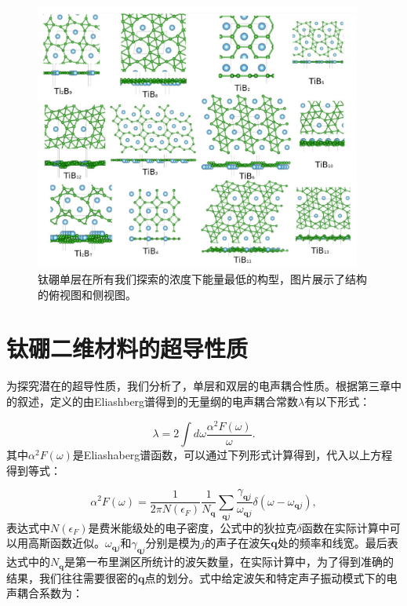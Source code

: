 \begin{figure}
  \includegraphics[width=0.96\textwidth]{figs/ch5_all_configs.png}
  \centering
  \caption{钛硼单层在所有我们探索的浓度下能量最低的构型，图片展示了结构的俯视图和侧视图。}
  \label{fig:ch5_all_configs}
\end{figure}

\section{钛硼二维材料的超导性质}
为探究潜在的超导性质，我们分析了，单层和双层的电声耦合性质。根据第三章中的叙述，定义的由Eliashberg谱得到的无量纲的电声耦合常数$\lambda$有以下形式：

\begin{equation}\label{eq:lambda_coupling}
  \lambda = 2 \int d\omega \frac{\alpha^2 F(\omega)}{\omega}.
\end{equation}
其中$\alpha^2 F(\omega)$是Eliashaberg谱函数，可以通过下列形式计算得到，代入以上方程得到等式：

\begin{equation}\label{eq:elishaberg_calc}
  \alpha^2 F(\omega) = \frac{1}{2\pi N(\epsilon_F)}\frac{1}{N_{\bm{q}}}
  \sum_{\bm{q}j} \frac{\gamma_{\bm{q}j}}{\omega_{\bm{q}j}}
  \delta(\omega-\omega_{\bm{q}j}),
\end{equation}
表达式中$N(\epsilon_F)$是费米能级处的电子密度，公式中的狄拉克$\delta$函数在实际计算中可以用高斯函数近似。$\omega_{\bm{q}j}$和$\gamma_{\bm{q}j}$分别是模为$j$的声子在波矢$\bm{q}$处的频率和线宽。最后表达式中的$N_{\bm{q}}$是第一布里渊区所统计的波矢数量，在实际计算中，为了得到准确的结果，我们往往需要很密的$\bm{q}$点的划分。式中给定波矢和特定声子振动模式下的电声耦合系数为：

